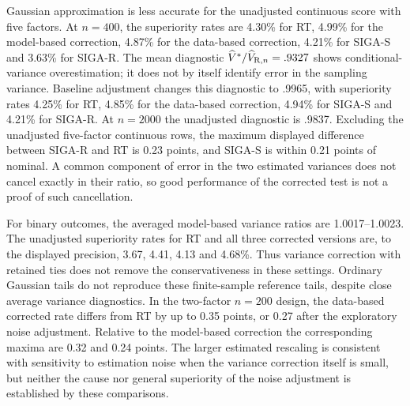 \documentclass[12pt,a4paper]{article}
\theoremstyle{definition}
\theoremstyle{remark}\newtheorem{remark}{Remark}
\numberwithin{equation}{section}
\begin{document}
Gaussian approximation is less accurate for the unadjusted continuous score with five factors. At $n=400$, the superiority rates are 4.30\% for RT, 4.99\% for the model-based correction, 4.87\% for the data-based correction, 4.21\% for SIGA-S and 3.63\% for SIGA-R. The mean diagnostic $\widehat V^*/\widehat V_{{\rm R},n}=.9327$ shows conditional-variance overestimation; it does not by itself identify error in the sampling variance. Baseline adjustment changes this diagnostic to .9965, with superiority rates 4.25\% for RT, 4.85\% for the data-based correction, 4.94\% for SIGA-S and 4.21\% for SIGA-R. At $n=2000$ the unadjusted diagnostic is .9837. Excluding the unadjusted five-factor continuous rows, the maximum displayed difference between SIGA-R and RT is 0.23 points, and SIGA-S is within 0.21 points of nominal. A common component of error in the two estimated variances does not cancel exactly in their ratio, so good performance of the corrected test is not a proof of such cancellation.

For binary outcomes, the averaged model-based variance ratios are 1.0017--1.0023. The unadjusted superiority rates for RT and all three corrected versions are, to the displayed precision, 3.67, 4.41, 4.13 and 4.68\%. Thus variance correction with retained ties does not remove the conservativeness in these settings. Ordinary Gaussian tails do not reproduce these finite-sample reference tails, despite close average variance diagnostics. In the two-factor $n=200$ design, the data-based corrected rate differs from RT by up to 0.35 points, or 0.27 after the exploratory noise adjustment. Relative to the model-based correction the corresponding maxima are 0.32 and 0.24 points. The larger estimated rescaling is consistent with sensitivity to estimation noise when the variance correction itself is small, but neither the cause nor general superiority of the noise adjustment is established by these comparisons.
\end{document}
